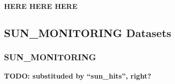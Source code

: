 \documentclass[a4paper,11pt,pdftex,twoside]{scrartcl}
\renewcommand{\bf}{\normalfont \bfseries}
\begin{document}
{{{%
%

{\bf HERE HERE HERE}

\subsection{SUN\_MONITORING Datasets}

\subsubsection{SUN\_MONITORING}
\label{subsec_sun_monitoring}

{\bf TODO: substituded by ``sun\_hits'', right?}


}}}
\end{document}
